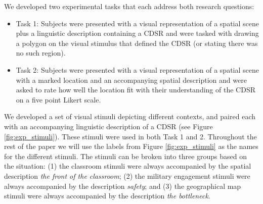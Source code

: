 \documentclass[11pt,letterpaper]{article}
\begin{document}

We developed two experimental tasks that each address both research questions:
\begin{itemize}
	\item{Task 1:} Subjects were presented with a visual representation of a spatial scene plus a linguistic description containing a CDSR and were tasked with drawing a polygon on the visual stimulus that defined the CDSR (or stating there was no such region).
	\item{Task 2:} Subjects were presented with a visual representation of a spatial scene with a marked location and an accompanying spatial description and were asked to rate how well the location fit with their understanding of the CDSR on a five point Likert scale.
\end{itemize}

We developed a set of visual stimuli depicting different contexts, and paired each with an accompanying linguistic description of a CDSR (see Figure \ref{fig:exp_stimuli}). These stimuli were used in both Task 1 and 2. Throughout the rest of the paper we will use the labels from Figure \ref{fig:exp_stimuli} as the names for the different stimuli. The stimuli can be broken into three groups based on the situation: (1) the classroom stimuli were always accompanied by the spatial description \emph{the front of the classroom}; (2) the military engagement stimuli were always accompanied by the description \emph{safety}; and (3) the geographical map stimuli were always accompanied by the description \emph{the bottleneck}.
\end{document}
